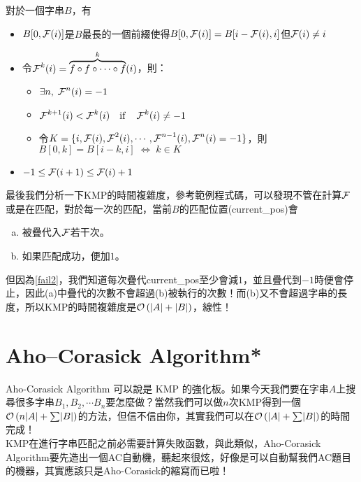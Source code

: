 \documentclass[a4paper,12pt]{book}
\begin{document}
\begin{theorem}[定理]
  對於一個字串$B$，有
  \begin{itemize}
    \item $B[0, \operatorname{\mathcal{F}}(i)]$是$B$最長的一個前綴使得$B[0, \operatorname{\mathcal{F}}(i)] = B[i - \operatorname{\mathcal{F}}(i), i]$但$\operatorname{\mathcal{F}}(i) \neq i$
    \item 令$\operatorname{\mathcal{F}}^k(i) = \overbrace{f \circ f \circ \cdots \circ f}^{k} (i)$，則：
      \begin{itemize}
        \item $\exists n, \; \operatorname{\mathcal{F}}^n(i) = -1$
        \item $ \operatorname{\mathcal{F}}^{k+1}(i) < \operatorname{\mathcal{F}}^{k}(i) \quad \text{if} \quad \operatorname{\mathcal{F}}^k(i) \neq -1 $ \listeqn \label{fail2}
        \item 令$K = \{ i, \operatorname{\mathcal{F}}(i), \operatorname{\mathcal{F}}^2(i) , \cdots , \operatorname{\mathcal{F}}^{n-1}(i), \operatorname{\mathcal{F}}^n(i) = -1\}$，則\\$B[0, k] = B[i-k, i] \; \Leftrightarrow \; k \in K$ \listeqn
      \end{itemize}
    \item $-1 \leq \operatorname{\mathcal{F}}(i+1) \leq \operatorname{\mathcal{F}}(i) + 1$ \listeqn
  \end{itemize}
\end{theorem}

最後我們分析一下KMP的時間複雜度，參考範例程式碼，可以發現不管在計算$\operatorname{\mathcal{F}}$或是在匹配，對於每一次的匹配，當前$B$的匹配位置(current\_pos)會
\begin{enumerate}[(a)]
  \item 被疊代入$\operatorname{\mathcal{F}}$若干次。
  \item 如果匹配成功，便加$1$。
\end{enumerate}
但因為\eqref{fail2}，我們知道每次疊代current\_pos至少會減$1$，並且疊代到$-1$時便會停止，因此(a)中疊代的次數不會超過(b)被執行的次數！而(b)又不會超過字串的長度，所以KMP的時間複雜度是$\operatorname{\mathcal{O}}\left(\lvert A \rvert + \lvert B \rvert\right)$，線性！

\section{Aho–Corasick Algorithm*}
  Aho-Corasick Algorithm 可以說是 KMP 的強化板。如果今天我們要在字串$A$上搜尋很多字串$B_1, B_2, \cdots B_n$要怎麼做？當然我們可以做$n$次KMP得到一個$\operatorname{\mathcal{O}}\left(n\lvert A \rvert + \sum\lvert B \rvert\right)$的方法，但信不信由你，其實我們可以在$\operatorname{\mathcal{O}}\left(\lvert A \rvert + \sum \lvert B \rvert\right)$的時間完成！ \\
%
  KMP在進行字串匹配之前必需要計算失敗函數，與此類似，Aho-Corasick Algorithm要先造出一個AC自動機，聽起來很炫，好像是可以自動幫我們AC題目的機器，其實應該只是Aho-Corasick的縮寫而已啦！ \\
\end{document}
